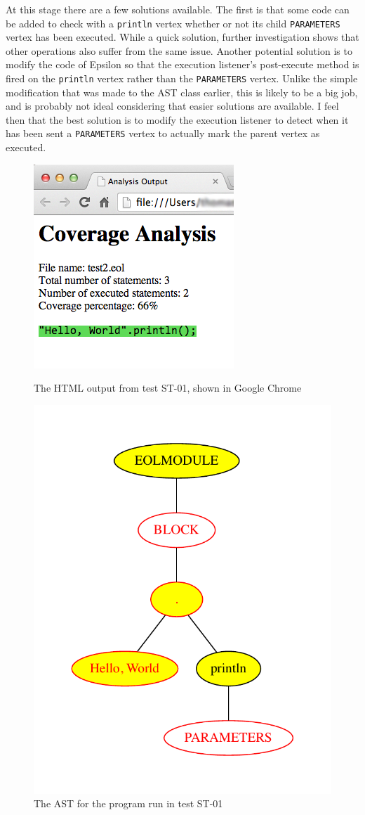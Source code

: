 At this stage there are a few solutions available. The first is that some code can be added to check with a \verb|println| vertex whether or not its child \verb|PARAMETERS| vertex has been executed. While a quick solution, further investigation shows that other operations also suffer from the same issue. Another potential solution is to modify the code of Epsilon so that the execution listener's post-execute method is fired on the \verb|println| vertex rather than the \verb|PARAMETERS| vertex. Unlike the simple modification that was made to the AST class earlier, this is likely to be a big job, and is probably not ideal considering that easier solutions are available. I feel then that the best solution is to modify the execution listener to detect when it has been sent a \verb|PARAMETERS| vertex to actually mark the parent vertex as executed.

\begin{figure}
\centering
\begin{minipage}{.5\textwidth}
  \centering
  \includegraphics[width=0.6\linewidth]{figures/ST01HTML.png}
  \caption{The HTML output from test ST-01, shown in Google Chrome}
  \label{fig:ST01HTML}
\end{minipage}%
\begin{minipage}{.5\textwidth}
  \centering
  \includegraphics[width=0.6\linewidth]{figures/ST01AST.pdf}
  \caption{The AST for the program run in test ST-01}
  \label{fig:ST01AST}
\end{minipage}
\end{figure}

